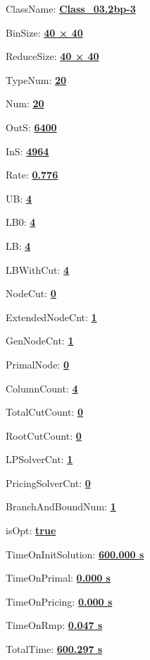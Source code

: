 \documentclass[11pt]{article}
\begin{document}
\pagestyle{empty}


ClassName: \underline{\textbf{Class_03.2bp-3}}
\par
BinSize: \underline{\textbf{40 × 40}}
\par
ReduceSize: \underline{\textbf{40 × 40}}
\par
TypeNum: \underline{\textbf{20}}
\par
Num: \underline{\textbf{20}}
\par
OutS: \underline{\textbf{6400}}
\par
InS: \underline{\textbf{4964}}
\par
Rate: \underline{\textbf{0.776}}
\par
UB: \underline{\textbf{4}}
\par
LB0: \underline{\textbf{4}}
\par
LB: \underline{\textbf{4}}
\par
LBWithCut: \underline{\textbf{4}}
\par
NodeCut: \underline{\textbf{0}}
\par
ExtendedNodeCnt: \underline{\textbf{1}}
\par
GenNodeCnt: \underline{\textbf{1}}
\par
PrimalNode: \underline{\textbf{0}}
\par
ColumnCount: \underline{\textbf{4}}
\par
TotalCutCount: \underline{\textbf{0}}
\par
RootCutCount: \underline{\textbf{0}}
\par
LPSolverCnt: \underline{\textbf{1}}
\par
PricingSolverCnt: \underline{\textbf{0}}
\par
BranchAndBoundNum: \underline{\textbf{1}}
\par
isOpt: \underline{\textbf{true}}
\par
TimeOnInitSolution: \underline{\textbf{600.000 s}}
\par
TimeOnPrimal: \underline{\textbf{0.000 s}}
\par
TimeOnPricing: \underline{\textbf{0.000 s}}
\par
TimeOnRmp: \underline{\textbf{0.047 s}}
\par
TotalTime: \underline{\textbf{600.297 s}}
\par
\newpage


\end{document}
